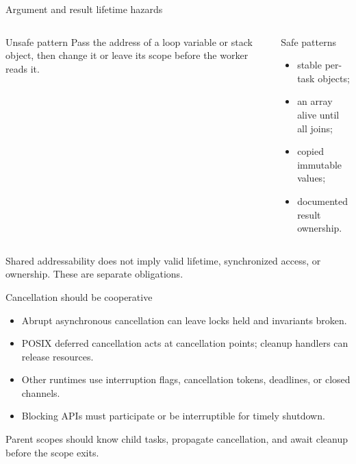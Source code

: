 \documentclass[aspectratio=169,11pt]{beamer}
\begin{document}
\begin{frame}{Argument and result lifetime hazards}
  \begin{columns}[T,onlytextwidth]
      \begin{alertblock}{Unsafe pattern}
        Pass the address of a loop variable or stack object, then change it or leave its scope before the worker reads it.
      \end{alertblock}
      \begin{block}{Safe patterns}
        \begin{itemize}
          \item stable per-task objects;
          \item an array alive until all joins;
          \item copied immutable values;
          \item documented result ownership.
        \end{itemize}
      \end{block}
  \end{columns}
  \begin{tcolorbox}[title=Subtlety,colback=osorange!5,colframe=osorange!70]
    Shared addressability does not imply valid lifetime, synchronized access, or ownership. These are separate obligations.
  \end{tcolorbox}
\end{frame}

\begin{frame}{Cancellation should be cooperative}
  \begin{itemize}
    \item Abrupt asynchronous cancellation can leave locks held and invariants broken.
    \item POSIX deferred cancellation acts at cancellation points; cleanup handlers can release resources.
    \item Other runtimes use interruption flags, cancellation tokens, deadlines, or closed channels.
    \item Blocking APIs must participate or be interruptible for timely shutdown.
  \end{itemize}
  \begin{tcolorbox}[title=Structured cancellation,colback=osgreen!5,colframe=osgreen!70]
    Parent scopes should know child tasks, propagate cancellation, and await cleanup before the scope exits.
  \end{tcolorbox}
\end{frame}
\end{document}

